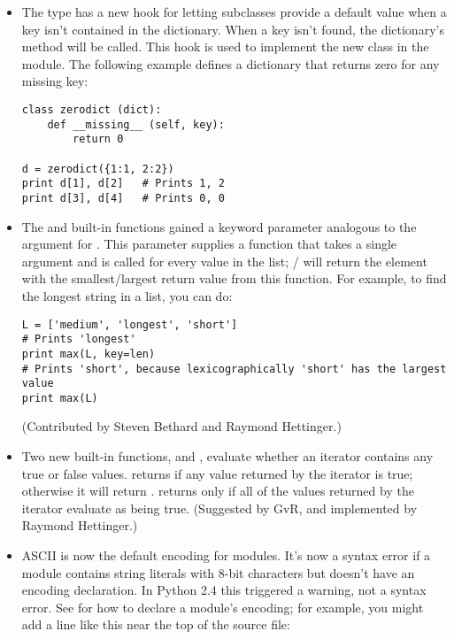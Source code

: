 \documentclass{howto}
\begin{document}
\begin{itemize}

\item The  type has a new hook for letting subclasses
provide a default value when a key isn't contained in the dictionary.
When a key isn't found, the dictionary's
method will be called.  This hook is used to implement
the new  class in the 
module.  The following example defines a dictionary 
that returns zero for any missing key:

\begin{verbatim}
class zerodict (dict):
    def __missing__ (self, key):
        return 0

d = zerodict({1:1, 2:2})
print d[1], d[2]   # Prints 1, 2
print d[3], d[4]   # Prints 0, 0
\end{verbatim}

\item The  and  built-in functions
gained a  keyword parameter analogous to the 
argument for .  This parameter supplies a function that
takes a single argument and is called for every value in the list;
/ will return the element with the 
smallest/largest return value from this function.
For example, to find the longest string in a list, you can do:

\begin{verbatim}
L = ['medium', 'longest', 'short']
# Prints 'longest'
print max(L, key=len)              
# Prints 'short', because lexicographically 'short' has the largest value
print max(L)         
\end{verbatim}

(Contributed by Steven Bethard and Raymond Hettinger.)

\item Two new built-in functions,  and
, evaluate whether an iterator contains any true or
false values.   returns  if any value
returned by the iterator is true; otherwise it will return
.   returns  only if
all of the values returned by the iterator evaluate as being true.
(Suggested by GvR, and implemented by Raymond Hettinger.)

\item ASCII is now the default encoding for modules.  It's now 
a syntax error if a module contains string literals with 8-bit
characters but doesn't have an encoding declaration.  In Python 2.4
this triggered a warning, not a syntax error.  See  
for how to declare a module's encoding; for example, you might add 
a line like this near the top of the source file:


\end{itemize}
\end{document}
